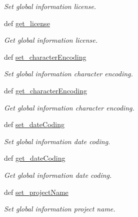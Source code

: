 \begin{DoxyCompactItemize}
\begin{DoxyCompactList}\small\item\em Set global information license. \end{DoxyCompactList}\item 
def \hyperlink{classlmf_1_1src_1_1core_1_1global__information_1_1_global_information_ae06bdf952c76c68d3f2820c43692fec9}{get\+\_\+license}
\begin{DoxyCompactList}\small\item\em Get global information license. \end{DoxyCompactList}\item 
def \hyperlink{classlmf_1_1src_1_1core_1_1global__information_1_1_global_information_a3eb128060394dfdb3988d387a3539c5e}{set\+\_\+character\+Encoding}
\begin{DoxyCompactList}\small\item\em Set global information character encoding. \end{DoxyCompactList}\item 
def \hyperlink{classlmf_1_1src_1_1core_1_1global__information_1_1_global_information_acdf3442cd2182471f8281d67ee3877a9}{get\+\_\+character\+Encoding}
\begin{DoxyCompactList}\small\item\em Get global information character encoding. \end{DoxyCompactList}\item 
def \hyperlink{classlmf_1_1src_1_1core_1_1global__information_1_1_global_information_aed122e9af0b0499c9e3291133d6c21c3}{set\+\_\+date\+Coding}
\begin{DoxyCompactList}\small\item\em Set global information date coding. \end{DoxyCompactList}\item 
def \hyperlink{classlmf_1_1src_1_1core_1_1global__information_1_1_global_information_a0002ebf6a0642e23a871eaf067f9da33}{get\+\_\+date\+Coding}
\begin{DoxyCompactList}\small\item\em Get global information date coding. \end{DoxyCompactList}\item 
def \hyperlink{classlmf_1_1src_1_1core_1_1global__information_1_1_global_information_a6180bd3138489d3e35e2386da8c26b0d}{set\+\_\+project\+Name}
\begin{DoxyCompactList}\small\item\em Set global information project name. \end{DoxyCompactList}\item 

\end{DoxyCompactItemize}
